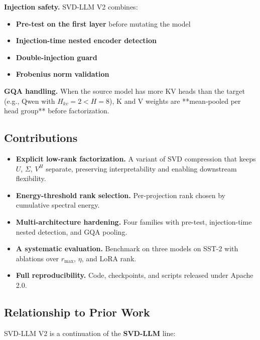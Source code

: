 \textbf{Injection safety.} SVD-LLM V2 combines:
\begin{itemize}
\item \textbf{Pre-test on the first layer} before mutating the model
\item \textbf{Injection-time nested encoder detection}
\item \textbf{Double-injection guard}
\item \textbf{Frobenius norm validation}

\end{itemize}
\textbf{GQA handling.} When the source model has more KV heads than the target 
(e.g., Qwen with $H_{kv} = 2 < H = 8$), K and V weights are **mean-pooled 
per head group** before factorization.

\subsection{Contributions}

\begin{itemize}
\item \textbf{Explicit low-rank factorization.} A variant of SVD compression that
  keeps $U$, $\Sigma$, $V^H$ separate, preserving interpretability and
  enabling downstream flexibility.
\item \textbf{Energy-threshold rank selection.} Per-projection rank chosen by
  cumulative spectral energy.
\item \textbf{Multi-architecture hardening.} Four families with pre-test, injection-time
  nested detection, and GQA pooling.
\item \textbf{A systematic evaluation.} Benchmark on three models on SST-2 with
  ablations over $r_\text{max}$, $\eta$, and LoRA rank.
\item \textbf{Full reproducibility.} Code, checkpoints, and scripts released under
  Apache 2.0.

\end{itemize}
\subsection{Relationship to Prior Work}

SVD-LLM V2 is a continuation of the \textbf{SVD-LLM} line:


